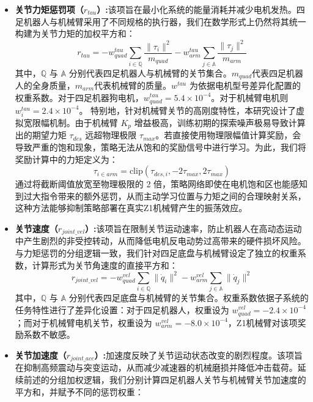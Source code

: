 \begin{itemize}
    \item\textbf{关节力矩惩罚项（$r_{tau}$）:}该项旨在最小化系统的能量消耗并减少电机发热。四足机器人与机械臂采用了不同规格的执行器，我们在数学形式上仍然将其统一构建为关节力矩的加权平方和：
          \begin{equation}
              r_{tau} = - w^{tau}_{quad} \sum_{i\in \mathbb{Q}} \frac{\| \tau_{i} \|^2}{m_{quad}} - w^{tau}_{arm} \sum_{j \in \mathbb{A}} \frac{\| \tau_{j} \|^2}{m_{arm}}
          \end{equation}
          其中，$\mathbb{Q}$ 与 $\mathbb{A}$ 分别代表四足机器人与机械臂的关节集合。$m_{quad}$代表四足机器人的全身质量，$m_{arm}$代表机械臂的质量。$w^{tau}$ 为依据电机型号差异化配置的权重系数。对于四足机器狗电机，$w^{tau}_{quad}=5.4\times 10^{-4}$。对于机械臂电机则$w^{tau}_i = 2.4\times10^{-4}$。
          特别地，针对机械臂关节的高刚度特性，本研究设计了虚拟宽限幅机制。由于机械臂 $K_p$ 增益极高，训练初期的探索噪声极易导致计算出的期望力矩 $\tau_{des}$ 远超物理极限 $\tau_{max}$。若直接使用物理限幅值计算奖励，会导致严重的饱和现象，策略无法从饱和的奖励信号中进行学习。为此，我们将奖励计算中的力矩定义为：
          \begin{equation}
              \tau_{i \in arm} = \text{clip}(\tau_{des,i}, -2\tau_{max}, 2\tau_{max})
          \end{equation}
          通过将截断阈值放宽至物理极限的 2 倍，策略网络即使在电机饱和区也能感知到过大指令带来的额外惩罚，从而主动学习位置与力矩之间的合理映射关系，这种方法能够抑制策略部署在真实Z1机械臂产生的振荡效应。
    \item \textbf{关节速度（$r_{joint\_vel}$）:}该项旨在限制关节运动速率，防止机器人在高动态运动中产生剧烈的非受控转动，从而降低电机反电动势过高带来的硬件损坏风险。与力矩惩罚的分组逻辑一致，我们针对四足底盘与机械臂设定了独立的权重系数，计算形式为关节角速度的直接平方和：
          \begin{equation}
              r_{joint\_vel} = - w^{vel}_{quad} \sum_{i \in \mathbb{Q}} \| \dot{q}_{i} \|^2 - w^{vel}_{arm} \sum_{j \in \mathbb{A}} \| \dot{q}_{j} \|^2
          \end{equation}
          其中，$\mathbb{Q}$ 与 $\mathbb{A}$ 分别代表四足底盘与机械臂的关节集合。权重系数依据子系统的任务特性进行了差异化设置：对于四足机器人，权重设为 $w^{vel}_{quad}=-2.4\times10^{-4}$；而对于机械臂电机关节，权重设为 $w^{vel}_{arm}=-8.0\times10^{-4}$，Z1机械臂对该项奖励系数不敏感。
    \item \textbf{关节加速度（$r_{joint\_acc}$）:}加速度反映了关节运动状态改变的剧烈程度。该项旨在抑制高频震动与突变运动，从而减少减速器的机械磨损并降低冲击载荷。延续前述的分组加权逻辑，我们分别计算四足机器人关节与机械臂关节加速度的平方和，并赋予不同的惩罚权重：

\end{itemize}
